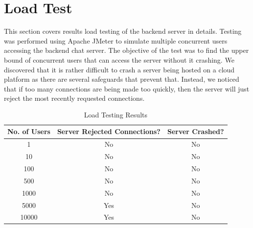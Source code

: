 \documentclass[12pt, titlepage]{article}
\begin{document}
\section{Load Test}\label{load}

This section covers results load testing of the backend server in details.
Testing was performed using Apache JMeter to simulate multiple concurrent users accessing the backend chat server. The objective of the test was to find the upper bound of concurrent users that can access the server without it crashing.
We discovered that it is rather difficult to crash a server being hosted on a cloud platform as there are several safeguards that prevent that.
Instead, we noticed that if too many connections are being made too quickly, then the server will just reject the most recently requested connections.

\begin{table}[!htbp]
  \centering
  \begin{tabular}{|c|c|c|}
  \hline
  No. of Users & Server Rejected Connections? & Server Crashed? \\ \hline
  1 & No & No \\ \hline
  10 & No & No \\ \hline
  100 & No & No \\ \hline
  500 & No & No \\ \hline
  1000 & No & No \\ \hline
  5000 & Yes & No \\ \hline
  10000 & Yes & No \\ \hline
  \end{tabular}
  \caption{Load Testing Results}
\end{table}
\end{document}
